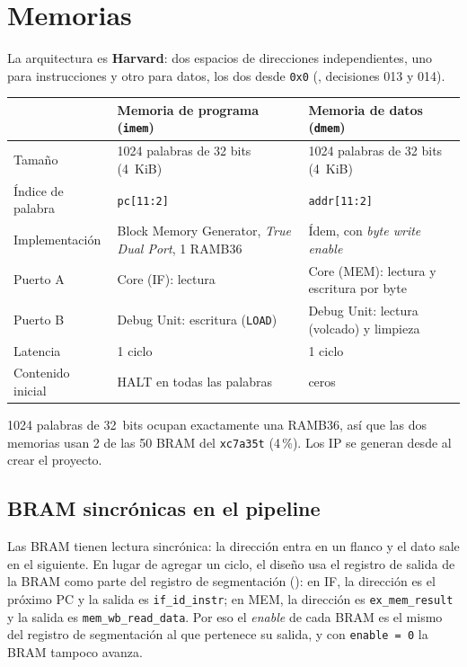 \section{Memorias}
\label{sec:memorias}

La arquitectura es \textbf{Harvard}: dos espacios de direcciones independientes, uno para
instrucciones y otro para datos, los dos desde \texttt{0x0}
(, decisiones 013 y 014).

\begin{center}
\small
\begin{tabular}{@{}p{2.4cm} p{6.1cm} p{6.3cm}@{}}
  \toprule
  & \textbf{Memoria de programa} (\texttt{imem}) & \textbf{Memoria de datos} (\texttt{dmem}) \\
  \midrule
  Tamaño            & 1024 palabras de 32 bits (4~KiB) & 1024 palabras de 32 bits (4~KiB) \\
  Índice de palabra & \texttt{pc[11:2]} & \texttt{addr[11:2]} \\
  Implementación    & Block Memory Generator, \emph{True Dual Port}, 1 RAMB36 & Ídem, con \emph{byte write enable} \\
  Puerto A          & Core (IF): lectura & Core (MEM): lectura y escritura por byte \\
  Puerto B          & Debug Unit: escritura (\texttt{LOAD}) & Debug Unit: lectura (volcado) y limpieza \\
  Latencia          & 1 ciclo & 1 ciclo \\
  Contenido inicial & HALT en todas las palabras & ceros \\
  \bottomrule
\end{tabular}
\end{center}

1024 palabras de 32~bits ocupan exactamente una RAMB36, así que las dos memorias usan 2 de las
50 BRAM del \texttt{xc7a35t} (4\,\%). Los IP se generan desde  al crear el proyecto.

\subsection{BRAM sincrónicas en el pipeline}

Las BRAM tienen lectura sincrónica: la dirección entra en un flanco y el dato sale en el
siguiente. En lugar de agregar un ciclo, el diseño usa el registro de salida de la BRAM como parte
del registro de segmentación (): en IF, la dirección es el próximo PC y la salida es
\texttt{if\_id\_instr}; en MEM, la dirección es \texttt{ex\_mem\_result} y la salida es
\texttt{mem\_wb\_read\_data}. Por eso el \emph{enable} de cada BRAM es el mismo del registro de
segmentación al que pertenece su salida, y con \texttt{enable = 0} la BRAM tampoco avanza.

